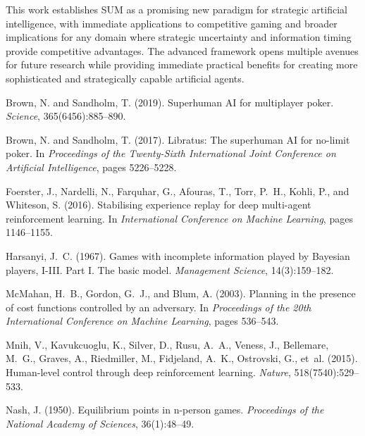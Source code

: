 \documentclass[11pt,a4paper]{article}
\begin{document}
This work establishes SUM as a promising new paradigm for strategic artificial intelligence, with immediate applications to competitive gaming and broader implications for any domain where strategic uncertainty and information timing provide competitive advantages. The advanced framework opens multiple avenues for future research while providing immediate practical benefits for creating more sophisticated and strategically capable artificial agents.


\begin{thebibliography}{99}

Brown, N. and Sandholm, T. (2019).
\newblock Superhuman AI for multiplayer poker.
\newblock \emph{Science}, 365(6456):885--890.

Brown, N. and Sandholm, T. (2017).
\newblock Libratus: The superhuman AI for no-limit poker.
\newblock In \emph{Proceedings of the Twenty-Sixth International Joint Conference on Artificial Intelligence}, pages 5226--5228.

Foerster, J., Nardelli, N., Farquhar, G., Afouras, T., Torr, P.~H., Kohli, P., and Whiteson, S. (2016).
\newblock Stabilising experience replay for deep multi-agent reinforcement learning.
\newblock In \emph{International Conference on Machine Learning}, pages 1146--1155.

Harsanyi, J.~C. (1967).
\newblock Games with incomplete information played by Bayesian players, I-III. Part I. The basic model.
\newblock \emph{Management Science}, 14(3):159--182.

McMahan, H.~B., Gordon, G.~J., and Blum, A. (2003).
\newblock Planning in the presence of cost functions controlled by an adversary.
\newblock In \emph{Proceedings of the 20th International Conference on Machine Learning}, pages 536--543.

Mnih, V., Kavukcuoglu, K., Silver, D., Rusu, A.~A., Veness, J., Bellemare, M.~G., Graves, A., Riedmiller, M., Fidjeland, A.~K., Ostrovski, G., et~al. (2015).
\newblock Human-level control through deep reinforcement learning.
\newblock \emph{Nature}, 518(7540):529--533.

Nash, J. (1950).
\newblock Equilibrium points in n-person games.
\newblock \emph{Proceedings of the National Academy of Sciences}, 36(1):48--49.


\end{thebibliography}
\end{document}

